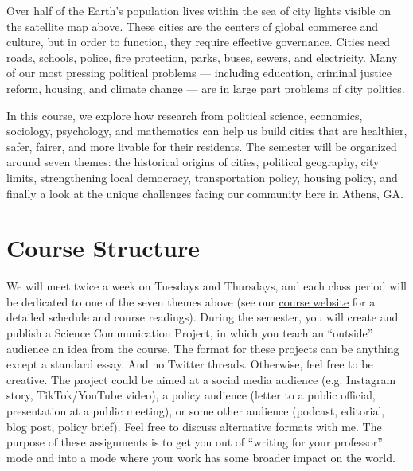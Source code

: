 \documentclass[11pt, letterpaper]{article}
\begin{document}
\noindent Over half of the Earth's population lives within the sea of city lights visible on the satellite map above. These cities are the centers of global commerce and culture, but in order to function, they require effective governance. Cities need roads, schools, police, fire protection, parks, buses, sewers, and electricity. Many of our most pressing political problems --- including education, criminal justice reform, housing, and climate change --- are in large part problems of city politics.

In this course, we explore how research from political science, economics, sociology, psychology, and mathematics can help us build cities that are healthier, safer, fairer, and more livable for their residents. The semester will be organized around seven themes: the historical origins of cities, political geography, city limits, strengthening local democracy, transportation policy, housing policy, and finally a look at the unique challenges facing our community here in Athens, GA. 



\section*{Course Structure}

We will meet twice a week on Tuesdays and Thursdays, and each class period will be dedicated to one of the seven themes above (see our \href{https://joeornstein.github.io/pols-4641/}{course website} for a detailed schedule and course readings). During the semester, you will create and publish a Science Communication Project, in which you teach an ``outside'' audience an idea from the course. The format for these projects can be anything except a standard essay. And no Twitter threads. Otherwise, feel free to be creative. The project could be aimed at a social media audience (e.g. Instagram story, TikTok/YouTube video), a policy audience (letter to a public official, presentation at a public meeting), or some other audience (podcast, editorial, blog post, policy brief). Feel free to discuss alternative formats with me. The purpose of these assignments is to get you out of ``writing for your professor'' mode and into a mode where your work has some broader impact on the world.
\end{document}
